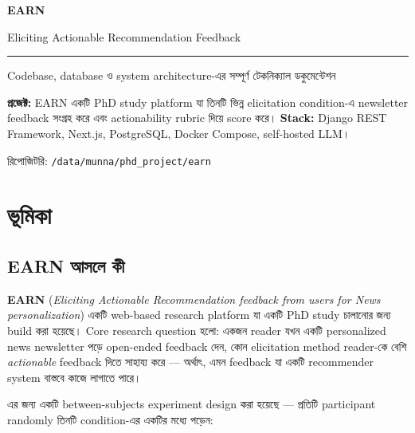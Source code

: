 \documentclass[11pt,a4paper]{article}
\newcommand{\summarybox}[1]{%
  \begin{center}
  \colorbox{softbg}{\parbox{0.94\textwidth}{#1}}
  \end{center}
}
\begin{document}
\begin{titlepage}
  \centering
  \vspace*{2.0cm}
  {\Huge\bfseries\color{accent} EARN\par}
  \vspace{0.4cm}
  {\LARGE Eliciting Actionable Recommendation Feedback\par}
  \vspace{1.2cm}
  \rule{0.82\textwidth}{0.8pt}
  \vspace{1.0cm}

  {\large Codebase, database ও system architecture-এর সম্পূর্ণ টেকনিক্যাল ডকুমেন্টেশন\par}
  \vspace{0.8cm}

  \summarybox{%
    \textbf{প্রজেক্ট:} EARN একটি PhD study platform যা তিনটি ভিন্ন elicitation condition-এ
    newsletter feedback সংগ্রহ করে এবং actionability rubric দিয়ে score করে। \textbf{Stack:}
    Django REST Framework, Next.js, PostgreSQL, Docker Compose, self-hosted LLM।
  }

  \vfill
  {\large রিপোজিটরি: \texttt{/data/munna/phd\_project/earn}\par}
\end{titlepage}

\tableofcontents
\newpage

\section{ভূমিকা}

\subsection{EARN আসলে কী}

\textbf{EARN} (\textit{Eliciting Actionable Recommendation feedback from users for News
personalization}) একটি web-based research platform যা একটি PhD study চালানোর জন্য build করা
হয়েছে। Core research question হলো: একজন reader যখন একটি personalized news newsletter পড়ে
open-ended feedback দেন, কোন elicitation method reader-কে বেশি \textit{actionable} feedback
দিতে সাহায্য করে --- অর্থাৎ, এমন feedback যা একটি recommender system বাস্তবে কাজে লাগাতে পারে।

এর জন্য একটি between-subjects experiment design করা হয়েছে --- প্রতিটি participant randomly
তিনটি condition-এর একটির মধ্যে পড়েন:
\end{document}
